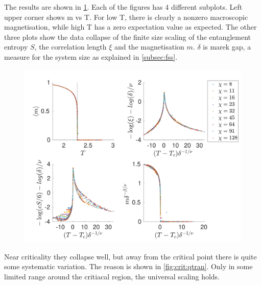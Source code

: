 The results are shown in \cref{fig:phase:g0:full}. Each of the figures has 4 different subplots. Left upper corner shows m vs T. For low T, there is clearly a nonzero macroscopic magnetisation, while high T has a zero expectation value as expected. The other three plots show the data collapse of the finite size scaling of the entanglement entropy $S$, the correlation length $\xi$ and the magnetisation $m$. $\delta$ is marek gap, a measure for the system size as explained in \cref{subsec:fss}.

\begin{figure}
  \center
  \includegraphics[width=\textwidth]{Figuren/phasediag/g0/Full.pdf}
  \caption{  }
  \label{fig:phase:g0:full}
\end{figure}


Near criticality they collapse well, but away from the critical point there is quite some systematic variation. The reason is shown in \cref{fig:crit:qtran}. Only in some limited range around the critiacal region, the universal scaling holds.

